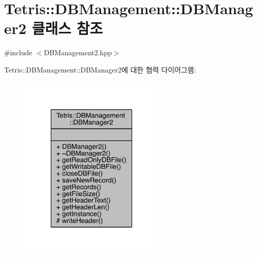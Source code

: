 \hypertarget{class_tetris_1_1_d_b_management_1_1_d_b_manager2}{}\section{Tetris\+:\+:D\+B\+Management\+:\+:D\+B\+Manager2 클래스 참조}
\label{class_tetris_1_1_d_b_management_1_1_d_b_manager2}


{\ttfamily \#include $<$D\+B\+Management2.\+hpp$>$}



Tetris\+:\+:D\+B\+Management\+:\+:D\+B\+Manager2에 대한 협력 다이어그램\+:
\nopagebreak
\begin{figure}[H]
\begin{center}
\leavevmode
\includegraphics[width=198pt]{da/dc8/class_tetris_1_1_d_b_management_1_1_d_b_manager2__coll__graph}
\end{center}
\end{figure}
